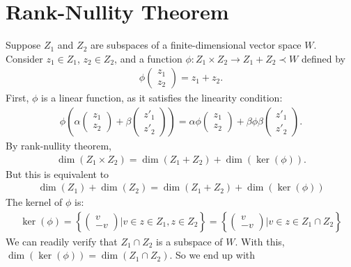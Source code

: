 \documentclass{book}
\theoremstyle{definition}
\begin{document}
\section{Rank-Nullity Theorem}
Suppose $Z_1$ and $Z_2$ are subspaces of a finite-dimensional vector space $W$. Consider $z_1\in Z_1$, $z_2\in Z_2$, and a function $\phi : Z_1 \times Z_2 \to Z_1 + Z_2 \prec W$ defined by
\begin{align*}
\phi\begin{pmatrix}
z_1\\z_2
\end{pmatrix}
=
z_1 + z_2.
\end{align*}
First, $\phi$ is a linear function, as it satisfies the linearity condition:
\begin{align*}
\phi\left(\alpha
\begin{pmatrix}
z_1\\z_2
\end{pmatrix}
+
\beta\begin{pmatrix}
z'_1\\
z'_2
\end{pmatrix}\right) = \alpha\phi\begin{pmatrix}
z_1\\z_2
\end{pmatrix} + \beta \phi \beta\begin{pmatrix}
z'_1\\
z'_2
\end{pmatrix}.
\end{align*}
By rank-nullity theorem,
\begin{align*}
\dim(Z_1\times Z_2) = \dim(Z_1 + Z_2) +\dim(\ker(\phi)). 
\end{align*}
But this is equivalent to
\begin{align*}
\dim(Z_1) + \dim(Z_2) = \dim(Z_1 + Z_2) +\dim(\ker(\phi))
\end{align*}
The kernel of $\phi$ is:
\begin{align*}
\ker(\phi) = 
\left\{
\begin{pmatrix}
v\\-v
\end{pmatrix}
\bigg\vert v\in z\in Z_1, z\in Z_2
\right\}
=
\left\{
\begin{pmatrix}
v\\-v
\end{pmatrix}
\bigg\vert v\in z\in Z_1 \cap Z_2
\right\}
\end{align*}
We can readily verify that $Z_1 \cap Z_2$ is a subspace of $W$. With this, $\dim(\ker(\phi)) = \dim(Z_1\cap Z_2)$. So we end up with
\end{document}
